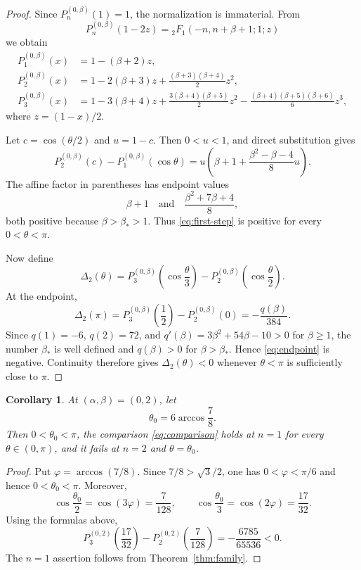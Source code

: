 \documentclass[11pt]{amsart}
\newtheorem{corollary}[theorem]{Corollary}
\theoremstyle{remark}
\begin{document}
\begin{proof}
Since $P_n^{(0,\beta)}(1)=1$, the normalization is immaterial. From
\[
P_n^{(0,\beta)}(1-2z)
={}_2F_1(-n,n+\beta+1;1;z)
\]
we obtain
\begin{align*}
P_1^{(0,\beta)}(x)
&=1-(\beta+2)z,\\
P_2^{(0,\beta)}(x)
&=1-2(\beta+3)z
  +\frac{(\beta+3)(\beta+4)}{2}z^2,\\
P_3^{(0,\beta)}(x)
&=1-3(\beta+4)z
  +\frac{3(\beta+4)(\beta+5)}{2}z^2
  -\frac{(\beta+4)(\beta+5)(\beta+6)}{6}z^3,
\end{align*}
where $z=(1-x)/2$.

Let $c=\cos(\theta/2)$ and $u=1-c$. Then $0<u<1$, and direct
substitution gives
\begin{equation}\label{eq:first-step}
P_2^{(0,\beta)}(c)-P_1^{(0,\beta)}(\cos\theta)
=
u\left(\beta+1+\frac{\beta^2-\beta-4}{8}u\right).
\end{equation}
The affine factor in parentheses has endpoint values
\[
\beta+1
\quad\text{and}\quad
\frac{\beta^2+7\beta+4}{8},
\]
both positive because $\beta>\beta_*>1$. Thus
\eqref{eq:first-step} is positive for every $0<\theta<\pi$.

Now define
\[
\Delta_2(\theta)
=
P_3^{(0,\beta)}\!\left(\cos\frac{\theta}{3}\right)
-
P_2^{(0,\beta)}\!\left(\cos\frac{\theta}{2}\right).
\]
At the endpoint,
\begin{equation}\label{eq:endpoint}
\Delta_2(\pi)
=
P_3^{(0,\beta)}\!\left(\frac12\right)-P_2^{(0,\beta)}(0)
=-\frac{q(\beta)}{384}.
\end{equation}
Since $q(1)=-6$, $q(2)=72$, and
$q'(\beta)=3\beta^2+54\beta-10>0$ for $\beta\ge1$, the number
$\beta_*$ is well defined and $q(\beta)>0$ for $\beta>\beta_*$. Hence
\eqref{eq:endpoint} is negative. Continuity therefore gives
$\Delta_2(\theta)<0$ whenever $\theta<\pi$ is sufficiently close to
$\pi$.
\end{proof}

\begin{corollary}\label{cor:witness}
At $(\alpha,\beta)=(0,2)$, let
\[
\theta_0=6\arccos\frac78.
\]
Then $0<\theta_0<\pi$, the comparison \eqref{eq:comparison} holds at
$n=1$ for every $\theta\in(0,\pi)$, and it fails at $n=2$ and
$\theta=\theta_0$.
\end{corollary}

\begin{proof}
Put $\varphi=\arccos(7/8)$. Since $7/8>\sqrt3/2$, one has
$0<\varphi<\pi/6$ and hence $0<\theta_0<\pi$. Moreover,
\[
\cos\frac{\theta_0}{2}=\cos(3\varphi)=\frac7{128},
\qquad
\cos\frac{\theta_0}{3}=\cos(2\varphi)=\frac{17}{32}.
\]
Using the formulas above,
\[
P_3^{(0,2)}\!\left(\frac{17}{32}\right)
-P_2^{(0,2)}\!\left(\frac7{128}\right)
=-\frac{6785}{65536}<0.
\]
The $n=1$ assertion follows from Theorem~\ref{thm:family}.
\end{proof}
\end{document}
